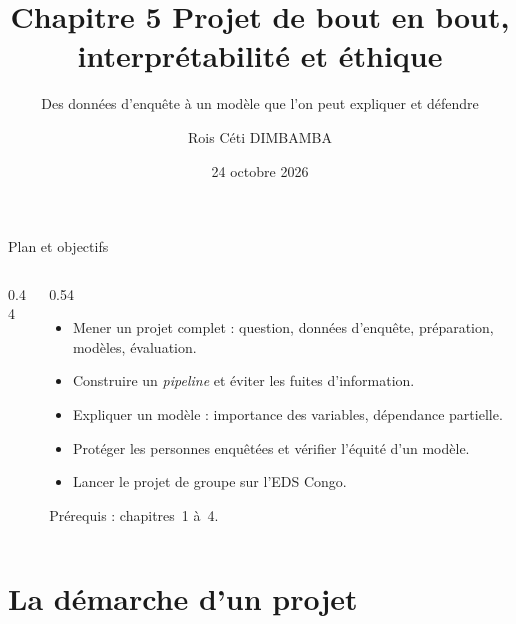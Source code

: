 \documentclass[aspectratio=169,11pt]{beamer}
\title{Chapitre 5 \textendash{} Projet de bout en bout, interprétabilité et éthique}
\subtitle{Des données d'enquête à un modèle que l'on peut expliquer et défendre}
\author{Rois Céti DIMBAMBA}
\institute{Ingénieur statisticien économiste \textperiodcentered{} Actuaire \textperiodcentered{} \href{https://rdimbamba.shinyapps.io/roisceti_e-cv/}{\textcolor{cnfVert}{CV en ligne}}}
\date{24 octobre 2026}
\begin{document}
\begin{frame}
  \titlepage
\end{frame}

\begin{frame}{Plan et objectifs}
  \begin{columns}[T]
    \begin{column}{0.44\textwidth}
      \footnotesize\tableofcontents
    \end{column}
    \begin{column}{0.54\textwidth}
      \begin{objectifs}
        \footnotesize
        \begin{itemize}
          \item Mener un projet complet : question, données d'enquête, préparation, modèles, évaluation.
          \item Construire un \emph{pipeline} et éviter les fuites d'information.
          \item Expliquer un modèle : importance des variables, dépendance partielle.
          \item Protéger les personnes enquêtées et vérifier l'équité d'un modèle.
          \item Lancer le projet de groupe sur l'EDS Congo.
        \end{itemize}
      \end{objectifs}
      \vskip-1mm{\scriptsize\color{cnfGris}Prérequis : chapitres~1 à~4.}
    \end{column}
  \end{columns}
\end{frame}

\section{La démarche d'un projet}
\end{document}
